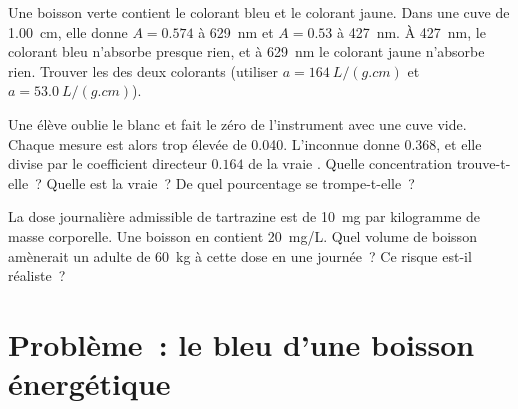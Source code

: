 \begin{exercise}[$\star\star\star$]\label{exo:g11:absorbance:13}
Une boisson verte contient le colorant bleu et le colorant jaune. Dans
une cuve de \qty{1.00}{cm}, elle donne $A = 0.574$ à \qty{629}{nm} et
$A = 0.53$ à \qty{427}{nm}. À \qty{427}{nm}, le colorant bleu n'absorbe
presque rien, et à \qty{629}{nm} le colorant jaune n'absorbe rien.
Trouver les  des deux colorants (utiliser
$a = \qty{164}{L/(g.cm)}$ et
$a = \qty{53.0}{L/(g.cm)}$).
\end{exercise}

\begin{exercise}[$\star\star\star$]\label{exo:g11:absorbance:14}
Une élève oublie le blanc et fait le zéro de l'instrument avec une cuve
vide. Chaque mesure est alors trop élevée de \num{0.040}. L'inconnue
donne $0.368$, et elle divise par le coefficient directeur $0.164$ de la
vraie . Quelle concentration trouve-t-elle~? Quelle
est la vraie~? De quel pourcentage se trompe-t-elle~?
\end{exercise}

\begin{exercise}[$\star\star\star$]\label{exo:g11:absorbance:15}
La dose journalière admissible de tartrazine est de \qty{10}{mg} par
kilogramme de masse corporelle. Une boisson en contient \qty{20}{mg/L}.
Quel volume de boisson amènerait un adulte de \qty{60}{kg} à cette dose
en une journée~? Ce risque est-il réaliste~?
\end{exercise}

\section{Problème~: le bleu d'une boisson énergétique}


